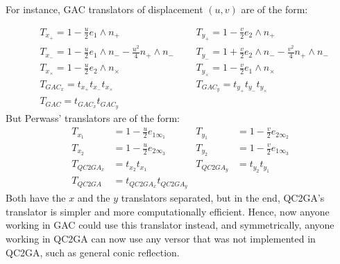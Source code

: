 \documentclass{birkjour}
\begin{document}
~\\
For instance, GAC translators of displacement \((u,v)\) are of the form:



    \begin{align}
    &T_{x_+} = 1 - \frac{u}{2} e_1\wedge n_+  &
    &T_{y_+} = 1 - \frac{v}{2} e_2\wedge n_+ \\
    &T_{x_-} = 1 - \frac{u}{2} e_1\wedge n_-  - \frac{u^2}{4} n_+\wedge n_-  & ~~~
    &T_{y_-} = 1 + \frac{v}{2} e_2\wedge n_- - \frac{v^2}{4} n_+\wedge n_-  \\
    &T_{x_\times} = 1 - \frac{u}{2} e_2\wedge n_\times &
    &T_{y_\times} = 1 - \frac{v}{2} e_1\wedge n_\times \\
    &T_{GAC_x} = t_{x_+} t_{x_-} t_{x_\times} &
    &T_{GAC_y} = t_{y_+} t_{y_-} t_{y_\times} \\
    &T_{GAC} = t_{GAC_x} t_{GAC_y}
    \end{align}
But Perwass' translators are of the form:
    \begin{align}
    T_{x_1} &= 1 - \frac{u}{2} e_{1\infty_1} &
    T_{y_1} &= 1 - \frac{v}{2} e_{2\infty_2} \\
    T_{x_2} &= 1 - \frac{u}{2} e_{2\infty_3} &
    T_{y_2} &= 1 - \frac{v}{2} e_{1\infty_3} \\
    T_{QC2GA_x} &= t_{x_2} t_{x_1} &
    T_{QC2GA_y} &= t_{y_2} t_{y_1} \\
    T_{QC2GA} &= t_{QC2GA_x} t_{QC2GA_y}
    \end{align}
Both have the \(x\) and the \(y\) translators separated, but in the end, QC2GA's translator is simpler and more computationally efficient. Hence, now anyone working in GAC could use this translator instead, and symmetrically, anyone working in QC2GA can now use any versor that was not implemented in QC2GA, such as general conic reflection.
\end{document}
